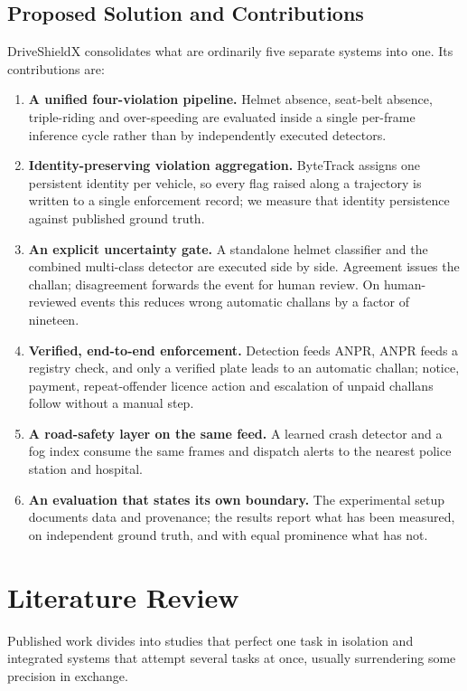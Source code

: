 \documentclass[10pt,a4paper,twocolumn]{article}
\begin{document}
\subsection{Proposed Solution and Contributions}
DriveShieldX consolidates what are ordinarily five separate systems into one. Its contributions are:
\begin{enumerate}
\item \textbf{A unified four-violation pipeline.} Helmet absence, seat-belt absence, triple-riding and over-speeding
are evaluated inside a single per-frame inference cycle rather than by independently executed detectors.
\item \textbf{Identity-preserving violation aggregation.} ByteTrack assigns one persistent identity per vehicle, so
every flag raised along a trajectory is written to a single enforcement record; we measure that identity persistence
against published ground truth.
\item \textbf{An explicit uncertainty gate.} A standalone helmet classifier and the combined multi-class detector are
executed side by side. Agreement issues the challan; disagreement forwards the event for human review. On
human-reviewed events this reduces wrong automatic challans by a factor of nineteen.
\item \textbf{Verified, end-to-end enforcement.} Detection feeds ANPR, ANPR feeds a registry check, and only a
verified plate leads to an automatic challan; notice, payment, repeat-offender licence action and escalation of unpaid
challans follow without a manual step.
\item \textbf{A road-safety layer on the same feed.} A learned crash detector and a fog index consume the same frames
and dispatch alerts to the nearest police station and hospital.
\item \textbf{An evaluation that states its own boundary.} The experimental setup documents data and provenance; the
results report what has been measured, on independent ground truth, and with equal prominence what has not.
\end{enumerate}

\section{Literature Review}
Published work divides into studies that perfect one task in isolation and integrated systems that attempt several
tasks at once, usually surrendering some precision in exchange.
\end{document}
